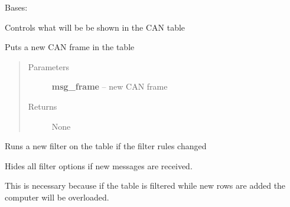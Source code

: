 \documentclass[letterpaper,10pt,english]{sphinxmanual}
\begin{document}
\begin{fulllineitems}
\label{gui:gui.communication.CanTableControl}
Bases: 

Controls what will be be shown in the CAN table

\begin{fulllineitems}
\label{gui:gui.communication.CanTableControl.add_data}
Puts a new CAN frame in the table
\begin{quote}\begin{description}
\item[{Parameters}] \leavevmode
\textbf{msg\_frame} -- new CAN frame

\item[{Returns}] \leavevmode
None

\end{description}\end{quote}

\end{fulllineitems}


\begin{fulllineitems}
\label{gui:gui.communication.CanTableControl.change_typ_filter}
Runs a new filter on the table if the filter rules changed

\end{fulllineitems}


\begin{fulllineitems}
\label{gui:gui.communication.CanTableControl.run_button_clicked}
Hides all filter options if new messages are received.

This is necessary because if the table is filtered while new rows are added the computer will be overloaded.

\end{fulllineitems}


\end{fulllineitems}

\end{document}
